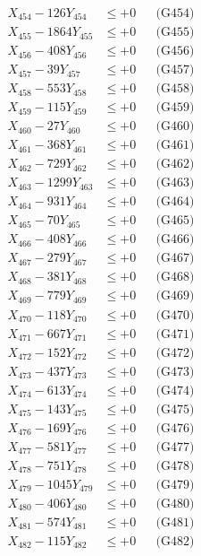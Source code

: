 \documentclass[a4paper,10pt]{article}
\begin{document}
{\begin{align}
X_{454} - 126Y_{454} &\leq +0 && \text{(G454)} \\
X_{455} - 1864Y_{455} &\leq +0 && \text{(G455)} \\
X_{456} - 408Y_{456} &\leq +0 && \text{(G456)} \\
X_{457} - 39Y_{457} &\leq +0 && \text{(G457)} \\
X_{458} - 553Y_{458} &\leq +0 && \text{(G458)} \\
X_{459} - 115Y_{459} &\leq +0 && \text{(G459)} \\
X_{460} - 27Y_{460} &\leq +0 && \text{(G460)} \\
\allowbreak
X_{461} - 368Y_{461} &\leq +0 && \text{(G461)} \\
X_{462} - 729Y_{462} &\leq +0 && \text{(G462)} \\
X_{463} - 1299Y_{463} &\leq +0 && \text{(G463)} \\
X_{464} - 931Y_{464} &\leq +0 && \text{(G464)} \\
X_{465} - 70Y_{465} &\leq +0 && \text{(G465)} \\
X_{466} - 408Y_{466} &\leq +0 && \text{(G466)} \\
X_{467} - 279Y_{467} &\leq +0 && \text{(G467)} \\
X_{468} - 381Y_{468} &\leq +0 && \text{(G468)} \\
X_{469} - 779Y_{469} &\leq +0 && \text{(G469)} \\
X_{470} - 118Y_{470} &\leq +0 && \text{(G470)} \\
\allowbreak
X_{471} - 667Y_{471} &\leq +0 && \text{(G471)} \\
X_{472} - 152Y_{472} &\leq +0 && \text{(G472)} \\
X_{473} - 437Y_{473} &\leq +0 && \text{(G473)} \\
X_{474} - 613Y_{474} &\leq +0 && \text{(G474)} \\
X_{475} - 143Y_{475} &\leq +0 && \text{(G475)} \\
X_{476} - 169Y_{476} &\leq +0 && \text{(G476)} \\
X_{477} - 581Y_{477} &\leq +0 && \text{(G477)} \\
X_{478} - 751Y_{478} &\leq +0 && \text{(G478)} \\
X_{479} - 1045Y_{479} &\leq +0 && \text{(G479)} \\
X_{480} - 406Y_{480} &\leq +0 && \text{(G480)} \\
\allowbreak
X_{481} - 574Y_{481} &\leq +0 && \text{(G481)} \\
X_{482} - 115Y_{482} &\leq +0 && \text{(G482)} \\

\end{align}}
\end{document}
